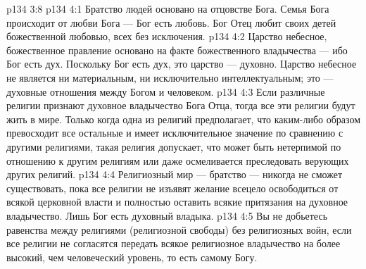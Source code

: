 \vs p134 3:8 
\vs p134 4:1 Братство людей основано на отцовстве Бога. Семья Бога происходит от любви Бога --- Бог есть любовь. Бог Отец любит своих детей божественной любовью, всех без исключения.
\vs p134 4:2 Царство небесное, божественное правление основано на факте божественного владычества --- ибо Бог есть дух. Поскольку Бог есть дух, это царство --- духовно. Царство небесное не является ни материальным, ни исключительно интеллектуальным; это --- духовные отношения между Богом и человеком.
\vs p134 4:3 Если различные религии признают духовное владычество Бога Отца, тогда все эти религии будут жить в мире. Только когда одна из религий предполагает, что каким\hyp{}либо образом превосходит все остальные и имеет исключительное значение по сравнению с другими религиями, такая религия допускает, что может быть нетерпимой по отношению к другим религиям или даже осмеливается преследовать верующих других религий.
\vs p134 4:4 Религиозный мир --- братство --- никогда не сможет существовать, пока все религии не изъявят желание всецело освободиться от всякой церковной власти и полностью оставить всякие притязания на духовное владычество. Лишь Бог есть духовный владыка.
\vs p134 4:5 Вы не добьетесь равенства между религиями (религиозной свободы) без религиозных войн, если все религии не согласятся передать всякое религиозное владычество на более высокий, чем человеческий уровень, то есть самому Богу.
